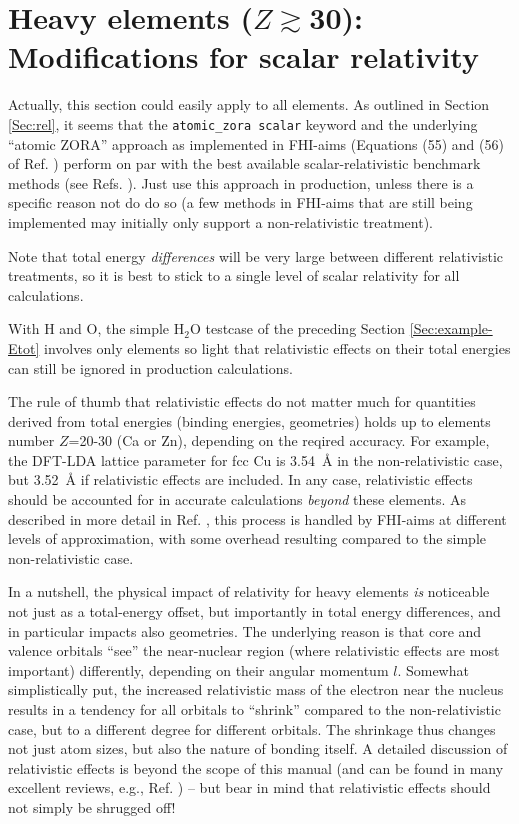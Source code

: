 \section{Heavy elements ($Z\gtrsim$30): Modifications for scalar relativity}
\label{Sec:rel-example}

Actually, this section could easily apply to all elements. As outlined
in Section \ref{Sec:rel}, it seems that the 
\texttt{atomic\_zora scalar} keyword and the underlying ``atomic
ZORA'' approach as implemented in FHI-aims (Equations (55) and (56) of
Ref. \cite{Blum08}) perform on par with the best available
scalar-relativistic benchmark methods (see
Refs. \cite{Lejaeghereaad3000,Huhn2017_SOC}). Just use this approach
in production, unless there is a specific reason not do do so
(a few methods in FHI-aims that are still being implemented may
initially only support a non-relativistic treatment).

Note that total energy \emph{differences} will be very large between
different relativistic treatments, so it is best to stick to a single
level of scalar relativity for all calculations.

With H and O, the simple H$_2$O testcase of the preceding Section
\ref{Sec:example-Etot} involves only 
elements so light that relativistic effects on their total energies
can still be ignored in production calculations. 

The rule of thumb that relativistic effects do not matter much for
quantities derived from total energies (binding energies, geometries)
holds up to elements number $Z$=20-30 (Ca or Zn), depending on the
reqired accuracy. For example, the DFT-LDA lattice parameter for fcc
Cu is 3.54~{\AA} in the non-relativistic case, but 3.52~{\AA} if
relativistic effects are included. In any case, relativistic effects
should be accounted for in accurate calculations \emph{beyond} these
elements. As described in more detail in Ref. \cite{Blum08}, this
process is handled by FHI-aims at different levels of approximation,
with some overhead resulting compared to the simple non-relativistic
case. 

In a nutshell, the physical impact of relativity for heavy elements
\emph{is} noticeable not just as a total-energy offset, but
importantly in total energy differences, and in particular impacts
also geometries. The underlying reason is that core and 
valence orbitals ``see'' the near-nuclear region (where relativistic
effects are most important) differently, depending on their 
angular momentum $l$. Somewhat simplistically put, the increased
relativistic mass of the electron near the nucleus results in a
tendency for all orbitals to ``shrink'' compared to the
non-relativistic case, but to a different degree for different
orbitals. The shrinkage thus changes not just atom sizes, but also the
nature of bonding itself. A detailed discussion of relativistic
effects is beyond the scope of this manual (and can be found in many
excellent reviews, e.g., Ref. \cite{Pyykko88}) -- but bear in mind
that relativistic effects should not simply be shrugged off!


